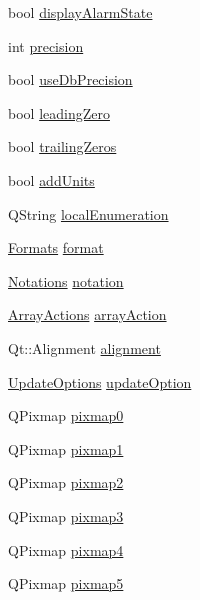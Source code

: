\begin{DoxyCompactItemize}
\item 
bool \hyperlink{classQEPushButton_a7753c754e5d4a8c9e0d247d7b94a649f}{displayAlarmState}
\item 
int \hyperlink{classQEPushButton_ae4b790894ce57d9d16321ab084ef465b}{precision}
\item 
bool \hyperlink{classQEPushButton_a54eac8b0529c52c2e96fbbdd0bb78f33}{useDbPrecision}
\item 
bool \hyperlink{classQEPushButton_a39d427acaebc8383149f1ea0fda0c56c}{leadingZero}
\item 
bool \hyperlink{classQEPushButton_ab1709fe632baa21e9bf92dccee1ad920}{trailingZeros}
\item 
bool \hyperlink{classQEPushButton_a6a2b19a08245fb02d076f5ea954d4823}{addUnits}
\item 
QString \hyperlink{classQEPushButton_a5e5b76726d7536cd9779bcdc2b9ddd30}{localEnumeration}
\item 
\hyperlink{classQEPushButton_a296a60bfbcbb88939a9152e75dd0f3a5}{Formats} \hyperlink{classQEPushButton_abd4b0d3b48e4e819f9a89f37b34c4df1}{format}
\item 
\hyperlink{classQEPushButton_a33dca048ed3e75cf2c46baca4befe6f6}{Notations} \hyperlink{classQEPushButton_a180f3a67ef06214e07fd5d59e49e1793}{notation}
\item 
\hyperlink{classQEPushButton_abdadbc10b7de6910230af3e102f6296c}{ArrayActions} \hyperlink{classQEPushButton_a4f7d3bd9238cfbb811ae4aa83bc499eb}{arrayAction}
\item 
Qt::Alignment \hyperlink{classQEPushButton_a5bc6e1c38e2ca091f3a74daa07f8433e}{alignment}
\item 
\hyperlink{classQEPushButton_a8e2016e5cdcbe54a5fe6d22a32410834}{UpdateOptions} \hyperlink{classQEPushButton_a30f602810c258f809be5152eaeab7f70}{updateOption}
\item 
QPixmap \hyperlink{classQEPushButton_a345f5d33b6c338c20b7575e075eb7488}{pixmap0}
\item 
QPixmap \hyperlink{classQEPushButton_afc73bdbd2a700cb62ce0c5de423b9e85}{pixmap1}
\item 
QPixmap \hyperlink{classQEPushButton_ac8f2f8810fce18740a578256c8648a8b}{pixmap2}
\item 
QPixmap \hyperlink{classQEPushButton_a13af1cdcd6e4464bd9d17e57821195c6}{pixmap3}
\item 
QPixmap \hyperlink{classQEPushButton_a032990ba96ae30e11e314258a1a6d5b2}{pixmap4}
\item 
QPixmap \hyperlink{classQEPushButton_a9a354f3ca109fd25a5dcfd5d6c91119e}{pixmap5}

\end{DoxyCompactItemize}
